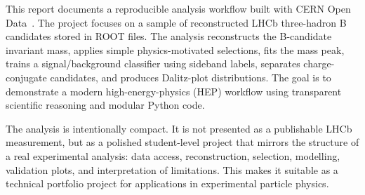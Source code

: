 This report documents a reproducible analysis workflow built with CERN Open Data~\cite{cernopendata}. The project focuses on a sample of reconstructed LHCb three-hadron B candidates stored in ROOT files. The analysis reconstructs the B-candidate invariant mass, applies simple physics-motivated selections, fits the mass peak, trains a signal/background classifier using sideband labels, separates charge-conjugate candidates, and produces Dalitz-plot distributions. The goal is to demonstrate a modern high-energy-physics (HEP) workflow using transparent scientific reasoning and modular Python code.

The analysis is intentionally compact. It is not presented as a publishable LHCb measurement, but as a polished student-level project that mirrors the structure of a real experimental analysis: data access, reconstruction, selection, modelling, validation plots, and interpretation of limitations. This makes it suitable as a technical portfolio project for applications in experimental particle physics.
